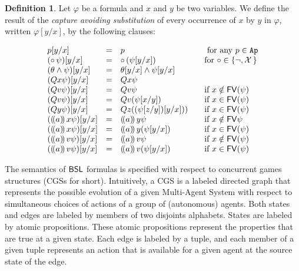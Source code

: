 \documentclass{article}
\theoremstyle{definition}
\newtheorem{definition}{Definition}[section]
\begin{document}
\begin{definition}
       Let $\varphi$ be a formula and $x$ and $y$ be two variables. We define the result of the \emph{capture avoiding substitution} of every occurrence of $x$ by $y$ in $\varphi$, written $\varphi[y/x]$, by the following clauses: 

    $$\begin{array}{l@{\quad=\quad}l@{\qquad}l}
        p[y/x] & p &\mbox{ for any $p\in \Ap$}\\
       ( \circ\, \psi )[y/x] & \circ\, (\psi [y/x]) & \mbox{for $\circ\in \set{\neg,\prox}$} \\
       (\theta\land  \psi)[y/x] & \theta[y/x]  \land \psi[y/x] & \\
       (Q{x} \psi)[y/x] & Q{x}\psi\\
       (  Qv \psi) [y/x] &  Qv \psi \quad  &\mbox{if $x \notin \FV(\psi)$}\\
       (Qv \psi) [y/x] &  Qv (\psi [x/y]) & \mbox{if $x\in \FV(\psi)$}\\
       (Qy \psi)[y/x] & Qz ((\psi[z/y])[y/x])) &\mbox{if $x\in \FV(\psi)$}\\
       (\assign{a}{x} \psi)[y/x] & \assign{a}{y} \psi &\mbox{if $x\notin\FV{\psi}$} \\
       (\assign{a}{x} \psi) [y/x] & \assign{a}{y}(\psi[y/x]) & \mbox{if $x\in \FV(\psi)$}\\
       (\assign{a}{v} \psi) [y/x] & \assign{a}{v} \psi & \mbox{if $x\notin\FV(\psi)$}\\
       (\assign{a}{v} \psi) [y/x] & \assign{a}{v} (\psi[y/x]) & \mbox{if $x\in \FV(\psi)$}
    \end{array}$$

    
\end{definition}



The semantics of $\mathsf{BSL}$ formulas is specified with respect to concurrent games structures (CGSs for short). Intuitively, a CGS is a labeled directed  graph that represents the possible evolution of a given Multi-Agent System with respect to simultaneous choices of actions of a group of (autonomous) agents. 
Both states and edges are labeled by members of two disjoints alphabets. States are labeled by atomic propositions. These atomic propositions represent the properties that are true at a given state. Each edge is labeled by a tuple, and each member of a given tuple represents an action that is available for a given agent at the source state of the edge. 
\end{document}
